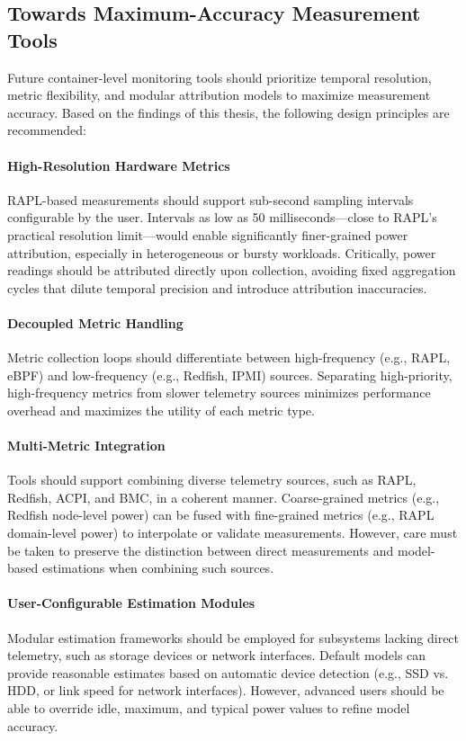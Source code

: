 \subsection{Towards Maximum-Accuracy Measurement Tools}
\label{sec:future-maximum-accuracy}

Future container-level monitoring tools should prioritize temporal resolution, metric flexibility, and modular attribution models to maximize measurement accuracy. Based on the findings of this thesis, the following design principles are recommended:

\paragraph{High-Resolution Hardware Metrics}
RAPL-based measurements should support sub-second sampling intervals configurable by the user. Intervals as low as 50 milliseconds---close to RAPL's practical resolution limit---would enable significantly finer-grained power attribution, especially in heterogeneous or bursty workloads. Critically, power readings should be attributed directly upon collection, avoiding fixed aggregation cycles that dilute temporal precision and introduce attribution inaccuracies.

\paragraph{Decoupled Metric Handling}
Metric collection loops should differentiate between high-frequency (e.g., RAPL, eBPF) and low-frequency (e.g., Redfish, IPMI) sources. Separating high-priority, high-frequency metrics from slower telemetry sources minimizes performance overhead and maximizes the utility of each metric type.

\paragraph{Multi-Metric Integration}
Tools should support combining diverse telemetry sources, such as RAPL, Redfish, ACPI, and BMC, in a coherent manner. Coarse-grained metrics (e.g., Redfish node-level power) can be fused with fine-grained metrics (e.g., RAPL domain-level power) to interpolate or validate measurements. However, care must be taken to preserve the distinction between direct measurements and model-based estimations when combining such sources.

\paragraph{User-Configurable Estimation Modules}
Modular estimation frameworks should be employed for subsystems lacking direct telemetry, such as storage devices or network interfaces. Default models can provide reasonable estimates based on automatic device detection (e.g., SSD vs. HDD, or link speed for network interfaces). However, advanced users should be able to override idle, maximum, and typical power values to refine model accuracy.

